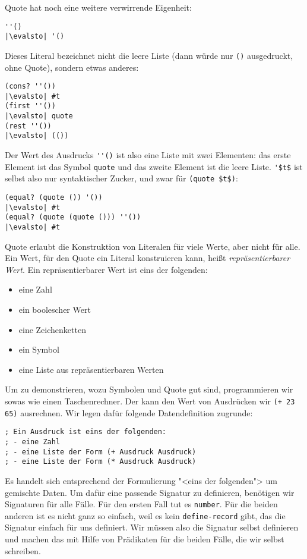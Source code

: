 Quote hat noch eine weitere verwirrende Eigenheit:
%
\begin{lstlisting}
''()
|\evalsto| '()
\end{lstlisting}
%
Dieses Literal bezeichnet nicht die leere Liste (dann würde nur
\lstinline{()} ausgedruckt, ohne Quote), sondern etwas anderes:
%
\begin{lstlisting}
(cons? ''())
|\evalsto| #t
(first ''())
|\evalsto| quote
(rest ''())
|\evalsto| (())
\end{lstlisting}
%
Der Wert des Ausdrucks \verb|''()| ist also eine Liste mit zwei
Elementen: das erste Element ist das Symbol \lstinline{quote} und das
zweite Element ist die leere Liste.  \lstinline{'$t$}
ist selbst also nur syntaktischer Zucker, und zwar für
\lstinline{(quote $t$)}:
%
\begin{lstlisting}
(equal? (quote ()) '())
|\evalsto| #t
(equal? (quote (quote ())) ''())
|\evalsto| #t
\end{lstlisting}
%
Quote erlaubt die Konstruktion von Literalen für viele Werte, aber
nicht für alle.  Ein Wert, für den Quote ein Literal konstruieren kann,
heißt \textit{repräsentierbarer
  Wert}.  Ein repräsentierbarer Wert ist
eins der folgenden:
%
\begin{itemize}
\item eine Zahl
\item ein boolescher Wert
\item eine Zeichenketten
\item ein Symbol
\item eine Liste aus repräsentierbaren Werten
\end{itemize}
%
Um zu demonstrieren, wozu Symbolen und Quote gut sind,
programmieren wir sowas wie einen Taschenrechner.
Der kann den Wert von Ausdrücken wir \lstinline{(+ 23 65)}
ausrechnen.  Wir legen dafür folgende Datendefinition zugrunde:
%
\begin{lstlisting}
; Ein Ausdruck ist eins der folgenden:
; - eine Zahl
; - eine Liste der Form (+ Ausdruck Ausdruck)
; - eine Liste der Form (* Ausdruck Ausdruck)
\end{lstlisting}
%
Es handelt sich entsprechend der Formulierung "<eins der folgenden">
um gemischte Daten.
Um dafür
eine passende Signatur zu definieren, benötigen wir Signaturen
für alle Fälle.  Für den ersten Fall tut es \lstinline{number}.  Für
die beiden anderen ist es nicht ganz so einfach, weil es kein
\lstinline{define-record} gibt, das die Signatur einfach für uns
definiert.  Wir müssen also die Signatur selbst definieren und machen
das mit Hilfe von Prädikaten für die beiden Fälle, die wir selbst schreiben.

